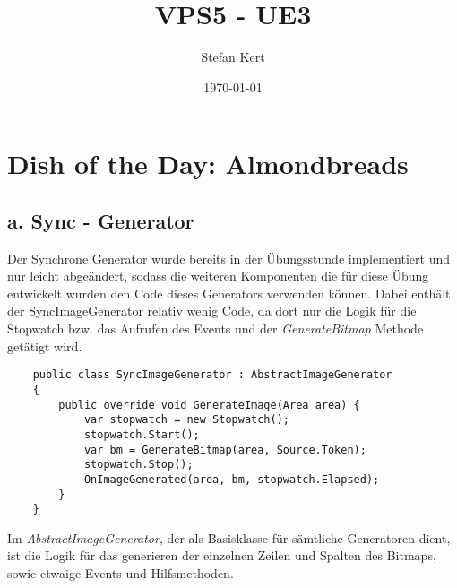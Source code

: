 \documentclass[a4paper,ngerman]{scrartcl}
\begin{document}
\title{VPS5 - UE3}
\author{Stefan Kert}
\date{\today}
\maketitle

\section{Dish of the Day: Almondbreads}
\subsection{a. Sync - Generator}
Der Synchrone Generator wurde bereits in der Übungsstunde implementiert und nur leicht abgeändert, sodass die weiteren Komponenten die für diese Übung entwickelt wurden den Code dieses Generators verwenden können. Dabei enthält der SyncImageGenerator relativ wenig Code, da dort nur die Logik für die Stopwatch bzw. das Aufrufen des Events und der \textit{GenerateBitmap} Methode getätigt wird.

\begin{lstlisting}
    public class SyncImageGenerator : AbstractImageGenerator
    {
        public override void GenerateImage(Area area) {
            var stopwatch = new Stopwatch();
            stopwatch.Start();
            var bm = GenerateBitmap(area, Source.Token);
            stopwatch.Stop();
            OnImageGenerated(area, bm, stopwatch.Elapsed);
        }
    }
\end{lstlisting}

Im \textit{AbstractImageGenerator}, der als Basisklasse für sämtliche Generatoren dient, ist die Logik für das generieren der einzelnen Zeilen und Spalten des Bitmaps, sowie etwaige Events und Hilfsmethoden. 
\end{document}
